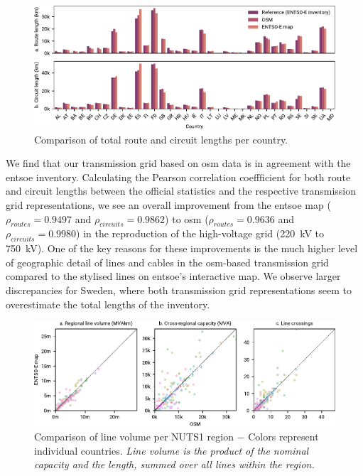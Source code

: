 \documentclass[fleqn,10pt]{wlscirep}
\begin{document}
\begin{figure}[!htbp]
    \centering
    \includegraphics{figures/fig_bar_lengths.pdf}
    \caption{Comparison of total route and circuit lengths per country.}
    \label{fig:bar_lengths}
\end{figure}

We find that our transmission grid based on \gls{osm} data is in agreement with the \acrshort{entsoe} inventory. Calculating the Pearson correlation coeffficient for both route and circuit lengths between the official statistics and the respective transmission grid representations, we see an overall improvement from the \acrshort{entsoe} map ($\rho_{routes} = 0.9497$ and $\rho_{circuits} = 0.9862$) to \gls{osm} ($\rho_{routes} = 0.9636$ and $\rho_{circuits} = 0.9980$) in the reproduction of the high-voltage grid (\SI{220}{\kilo\volt} to \SI{750}{\kilo\volt}). One of the key reasons for these improvements is the much higher level of geographic detail of lines and cables in the \gls{osm}-based transmission grid compared to the stylised lines on \acrshort{entsoe}'s interactive map. We observe larger discrepancies for Sweden, where both transmission grid representations seem to overestimate the total lengths of the inventory.

\begin{figure}[!htbp]
    \centering
    \includegraphics{figures/fig_scatter_joined.pdf}
    \caption{Comparison of line volume per NUTS1 region $-$ Colors represent individual countries. \textit{Line volume is the product of the nominal capacity and the length, summed over all lines within the region.}}
    \label{fig:scatter_joined}
\end{figure}
\end{document}
